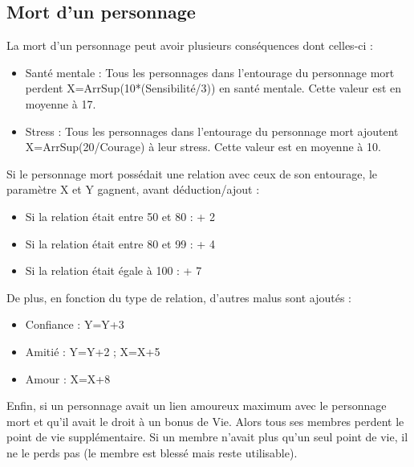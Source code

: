 \subsection{Mort d'un personnage}
La mort d'un personnage peut avoir plusieurs conséquences dont celles-ci :
\begin{itemize}
   \item Santé mentale : Tous les personnages dans l'entourage du personnage mort perdent X=ArrSup(10*(Sensibilité/3)) en santé mentale. Cette valeur est en moyenne à 17.
   \item Stress : Tous les personnages dans l'entourage du personnage mort ajoutent X=ArrSup(20/Courage) à leur stress. Cette valeur est en moyenne à 10.
\end{itemize}
Si le personnage mort possédait une relation avec ceux de son entourage, le paramètre X et Y gagnent, avant déduction/ajout :
\begin{itemize}
   \item Si la relation était entre 50 et 80 : + 2
   \item Si la relation était entre 80 et 99 : + 4
   \item Si la relation était égale à 100 : + 7
\end{itemize}
De plus, en fonction du type de relation, d'autres malus sont ajoutés :
\begin{itemize}
   \item Confiance : Y=Y+3
   \item Amitié : Y=Y+2 ; X=X+5
   \item Amour : X=X+8
\end{itemize}
Enfin, si un personnage avait un lien amoureux maximum avec le personnage mort et qu'il avait le droit à un bonus de Vie. Alors tous ses membres perdent le point de vie supplémentaire. Si un membre n'avait plus qu'un seul point de vie, il ne le perds pas (le membre est blessé mais reste utilisable).
